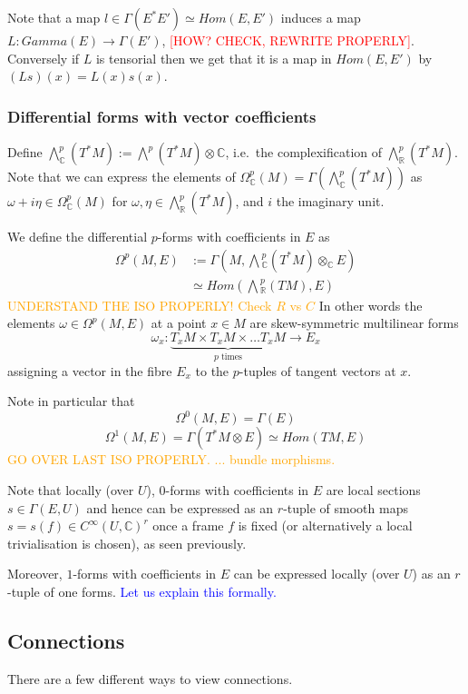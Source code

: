 \documentclass[a4paper]{article}
\theoremstyle{definition} \newtheorem*{definition}{Definition}
\theoremstyle{definition} \newtheorem*{definitions}{Definitions}
\theoremstyle{plain} \newtheorem{theorem}{Theorem}[section]
\theoremstyle{plain} \newtheorem{proposition}[theorem]{Proposition}
\theoremstyle{plain} \newtheorem{corollary}[theorem]{Corollary}
\theoremstyle{plain} \newtheorem{lemma}[theorem]{Lemma}
\theoremstyle{plain} \newtheorem{example}[theorem]{Example}
\newcommand{\checkCorrect}[1]{\textcolor{red}{#1}}
\newcommand{\understandBetter}[1]{\textcolor{orange}{#1}}
\newcommand{\explainFurther}[1]{\textcolor{blue}{#1}}
\newcommand{\realnos}{\mathbb{R}}
\newcommand{\complexnos}{\mathbb{C}}
\newcommand{\smoothCmaps}{C^\infty (U, \complexnos)}
\begin{document}
Note that a map $l\in \Gamma(E^\ast E') \simeq Hom(E,E')$ induces a map $L:Gamma(E)\to \Gamma(E')$, \checkCorrect{[HOW? CHECK, REWRITE PROPERLY]}.  Conversely if $L$ is tensorial then we get that it is a map in $Hom(E, E')$ by $(Ls)(x)=L(x)s(x)$. 

\subsubsection{Differential forms with vector coefficients}
Define $\bigwedge^p_\complexnos(T^\ast M):=\bigwedge^p (T^\ast M)\otimes \complexnos$, i.e.\ the complexification of $\bigwedge^p_\realnos(T^\ast M)$. Note that we can express the elements of $\Omega^p_\complexnos(M)=\Gamma(\bigwedge^p_\complexnos(T^\ast M))$ as $\omega+i\eta \in \Omega^p_\complexnos(M)$ for $\omega, \eta \in \bigwedge^p_\realnos(T^\ast M)$, and $i$ the imaginary unit. 

We define the differential $p$-forms with coefficients in $E$ as 
\begin{align*}
\Omega^p(M, E) & :=\Gamma(M, \bigwedge {}^p_\complexnos(T^\ast M) \otimes_\complexnos E) \\
& \simeq Hom(\bigwedge {}^p_\realnos (TM), E)
\end{align*}
\understandBetter{UNDERSTAND THE ISO PROPERLY! Check $R$ vs $C$}
In other words the elements $\omega\in \Omega^p(M, E)$ at a point $x\in M$ are skew-symmetric multilinear forms 
$$\omega_x:\underbrace{T_xM\times T_xM\times \ldots T_xM}_{p \text{ times}} \to E_x$$
assigning a vector in the fibre $E_x$ to the $p$-tuples of tangent vectors at $x$. 

Note in particular that 
$$\Omega^0(M, E) = \Gamma(E)$$
$$\Omega^1(M, E) = \Gamma(T^\ast M \otimes E) \simeq Hom(TM, E)$$
\understandBetter{GO OVER LAST ISO PROPERLY. ... bundle morphisms.}

Note that locally (over $U$),  $0$-forms with coefficients in $E$ are local sections $s\in \Gamma(E, U)$ and hence can be expressed as an $r$-tuple of smooth maps $s=s(f)\in \smoothCmaps^r$ once a frame $f$ is fixed (or alternatively a local trivialisation is chosen),  as seen previously.  

Moreover,  $1$-forms with coefficients in $E$ can be expressed locally (over $U$) as an $r$-tuple of one forms.  \explainFurther{Let us explain this formally. }

\subsection{Connections}
There are a few different ways to view connections.
\end{document}
